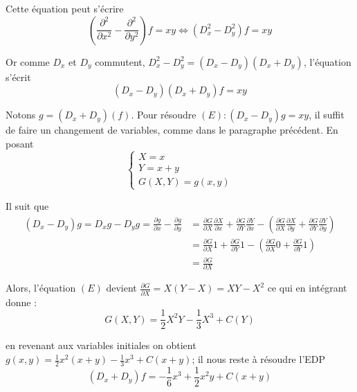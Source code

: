 \documentclass[12pt]{article}
\begin{document}
\begin{corrige}
Cette équation peut s'écrire
$$
\left(\frac{\partial^{2}}{\partial x^{2}} - \frac{\partial^{2}}{\partial y^{2}}\right) f = xy \Longleftrightarrow \left(D_{x}^{2} - D_{y}^{2}\right) f = xy
$$

Or comme $D_{x}$ et $D_{y}$ commutent, $D_{x}^{2} - D_{y}^{2} = \left(D_{x} - D_{y}\right)\left(D_{x} + D_{y}\right)$, l'équation s'écrit
$$
\left(D_{x} - D_{y}\right)\left(D_{x} + D_{y}\right) f = xy
$$

Notons $g = \left(D_{x} + D_{y}\right)(f)$. Pour résoudre $(E): \left(D_{x} - D_{y}\right) g = xy$, il suffit de faire un changement de variables, comme dans le paragraphe précédent. En posant
$$
\left\{\begin{array}{l}
X = x \\
Y = x + y \\
G(X, Y) = g(x, y)
\end{array}\right.
$$

Il suit que
$$
\begin{aligned}
\left(D_{x} - D_{y}\right) g = D_{x} g - D_{y} g = \frac{\partial g}{\partial x} - \frac{\partial g}{\partial y} & = \frac{\partial G}{\partial X} \frac{\partial X}{\partial x} + \frac{\partial G}{\partial Y} \frac{\partial Y}{\partial x} - \left(\frac{\partial G}{\partial X} \frac{\partial X}{\partial y} + \frac{\partial G}{\partial Y} \frac{\partial Y}{\partial y}\right) \\
& = \frac{\partial G}{\partial X} 1 + \frac{\partial G}{\partial Y} 1 - \left(\frac{\partial G}{\partial X} 0 + \frac{\partial G}{\partial Y} 1\right) \\
& = \frac{\partial G}{\partial X}
\end{aligned}
$$

Alors, l'équation $(E)$ devient $\frac{\partial G}{\partial X} = X(Y-X) = XY - X^{2}$ ce qui en intégrant donne :
$$
G(X, Y) = \frac{1}{2} X^{2} Y - \frac{1}{3} X^{3} + C(Y)
$$

en revenant aux variables initiales on obtient $g(x, y) = \frac{1}{2} x^{2}(x+y) - \frac{1}{3} x^{3} + C(x+y)$; il nous reste à résoudre l'EDP
$$
\left(D_{x} + D_{y}\right) f = -\frac{1}{6} x^{3} + \frac{1}{2} x^{2} y + C(x+y)
$$


\end{corrige}
\end{document}
